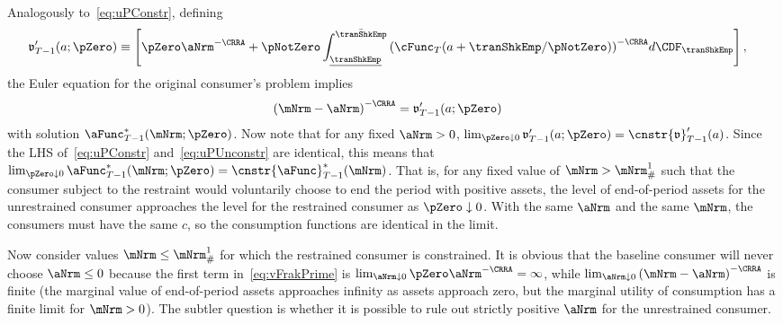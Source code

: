 \documentclass[\econtexRoot/BufferStockTheory]{subfiles}
\begin{document}
Analogously to~\eqref{eq:uPConstr}, defining
\begin{equation}\begin{gathered}\begin{aligned}
      \mathfrak{v}_{T-1}^{\prime}(a;\pZero)  & \equiv  \left[\pZero \aNrm^{-\CRRA}+\pNotZero\int_{\underline{\tranShkEmp}}^{\bar{\tranShkEmp}} {\left(\cFunc_{T}(a+\tranShkEmp/\pNotZero)\right)}^{-\CRRA} d\CDF_{\tranShkEmp}\right], \label{eq:vFrakPrime}
    \end{aligned}\end{gathered}\end{equation}
the Euler equation for the original consumer's problem implies
\begin{equation}\begin{gathered}\begin{aligned}
      {(\mNrm-\aNrm)}^{-\CRRA}  & = \mathfrak{v}_{T-1}^{\prime}(a;\pZero) \label{eq:uPUnconstr}
    \end{aligned}\end{gathered}\end{equation}
with solution $\aFunc_{T-1}^{*}(\mNrm;\pZero)$.
Now note that for any fixed $\aNrm>0$, $\lim_{\pZero \downarrow 0} \mathfrak{v}_{T-1}^{\prime}(a;\pZero) = \cnstr{\mathfrak{v}}_{T-1}^{\prime}(a)$.
Since the LHS of~\eqref{eq:uPConstr} and~\eqref{eq:uPUnconstr} are identical, this means that $\lim_{\pZero \downarrow 0} \aFunc_{T-1}^{*}(\mNrm;\pZero) = \cnstr{\aFunc}_{T-1}^{*}(\mNrm)$.
That is, for any fixed value of $\mNrm > \mNrm^{1}_{\#}$ such that the consumer subject to the restraint would voluntarily choose to end the period with positive assets, the level of end-of-period assets for the unrestrained consumer approaches the level for the restrained consumer as $\pZero \downarrow 0$.
With the same $\aNrm$ and the same $\mNrm$, the consumers must have the same $c$, so the consumption functions are identical in the limit.

Now consider values $\mNrm\leq \mNrm^{1}_{\#}$ for which the restrained consumer is constrained.
It is obvious that the baseline consumer will never choose $\aNrm \leq 0$ because the first term in~\eqref{eq:vFrakPrime} is $\lim_{\aNrm \downarrow 0} \pZero \aNrm^{-\CRRA} = \infty$, while $\lim_{\aNrm \downarrow 0} {(\mNrm-\aNrm)}^{-\CRRA}$ is finite (the marginal value of end-of-period assets approaches infinity as assets approach zero, but the marginal utility of consumption has a finite limit for $\mNrm>0$).
The subtler question is whether it is possible to rule out strictly positive $\aNrm$ for the unrestrained consumer.
\end{document}

